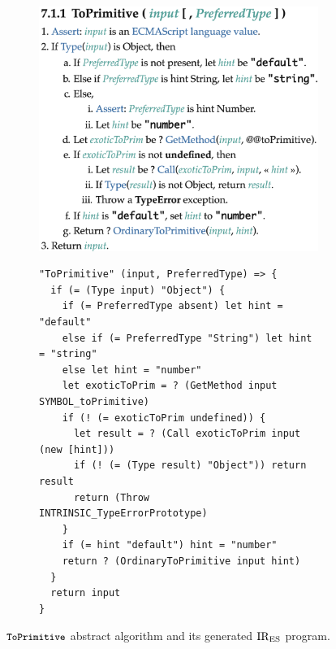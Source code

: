 \begin{figure}[t]
  \centering
  \begin{subfigure}{0.4\textwidth}
    \includegraphics[width=\textwidth]{img/to_primitive.png}
    \label{fig:to-primitive-es}
  \end{subfigure}
  \qquad
  \begin{subfigure}{0.48\textwidth}
    \begin{lstlisting}[style=ires]
"ToPrimitive" (input, PreferredType) => {
  if (= (Type input) "Object") {
    if (= PreferredType absent) let hint = "default"
    else if (= PreferredType "String") let hint = "string"
    else let hint = "number"
    let exoticToPrim = ? (GetMethod input SYMBOL_toPrimitive)
    if (! (= exoticToPrim undefined)) {
      let result = ? (Call exoticToPrim input (new [hint]))
      if (! (= (Type result) "Object")) return result
      return (Throw INTRINSIC_TypeErrorPrototype)
    }
    if (= hint "default") hint = "number"
    return ? (OrdinaryToPrimitive input hint)
  }
  return input
}
    \end{lstlisting}
    \label{fig:to-primitive-ires}
  \end{subfigure}
  \caption{\( \texttt{\small ToPrimitive} \) abstract algorithm
  and its generated \( \text{IR}_\text{ES} \) program.}
  \label{fig:to-primitive}
\end{figure}

